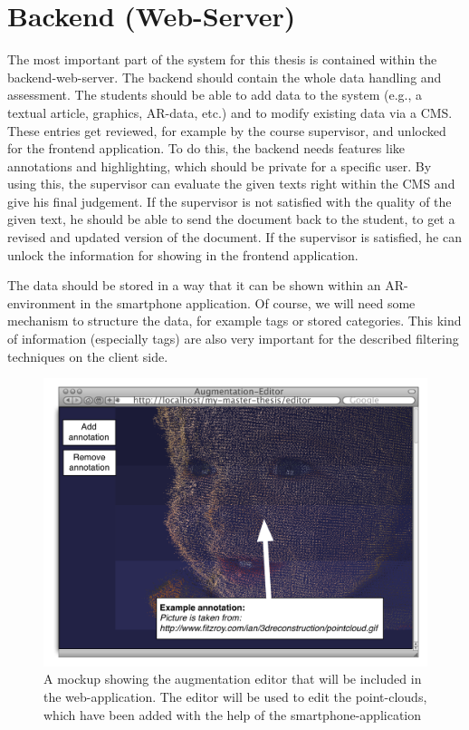 \section{Backend (Web-Server)}
The most important part of the system for this thesis is contained within the backend-web-server. The backend should contain the whole data handling and assessment. The students should be able to add data to the system (e.g., a textual article, graphics, \ac{AR}-data, etc.) and to modify existing data via a \ac{CMS}. These entries get reviewed, for example by the course supervisor, and unlocked for the frontend application. To do this, the backend needs features like annotations and highlighting, which should be private for a specific user. By using this, the supervisor can evaluate the given texts right within the \ac{CMS} and give his final judgement. If the supervisor is not satisfied with the quality of the given text, he should be able to send the document back to the student, to get a revised and updated version of the document. If the supervisor is satisfied, he can unlock the information for showing in the frontend application.


The data should be stored in a way that it can be shown within an \ac{AR}-environment in the smartphone application. Of course, we will need some mechanism to structure the data, for example tags or stored categories. This kind of information (especially tags) are also very important for the described filtering techniques on the client side.

\begin{figure}[th]
\centerline{\includegraphics[width=1\textwidth]{gfx/mockup_web_1}}
\caption{A mockup showing the augmentation editor that will be included in the web-application. The editor will be used to edit the point-clouds, which have been added with the help of the smartphone-application}
\label{augmentation_web}
\end{figure}

